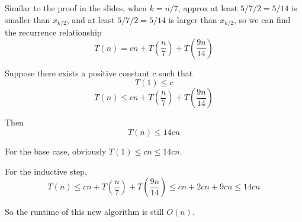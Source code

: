 \documentclass{article}
\begin{document}
\section{}
Similar to the proof in the slides, when $k=n/7$, approx at least $5/7/2=5/14$ is smaller than $x_{k/2}$, and at least $5/7/2=5/14$ is larger than $x_{k/2}$, so we can find the recurrence relationship
$$T(n)=cn+T\left(\frac{n}{7}\right)+T\left(\frac{9n}{14}\right)$$

Suppose there exists a positive constant $c$ such that 
$$T(1)\leqslant c$$
$$T(n)\leqslant cn+T\left(\frac{n}{7}\right)+T\left(\frac{9n}{14}\right)$$

Then $$T(n)\leqslant 14cn$$

For the base case, obviously $T(1)\leqslant cn\leqslant 14cn$.

For the inductive step,
$$T(n)\leqslant cn+T\left(\frac{n}{7}\right)+T\left(\frac{9n}{14}\right)\leqslant cn+2cn+9cn \leqslant 14cn$$

So the runtime of this new algorithm is still $O(n)$.
\end{document}
